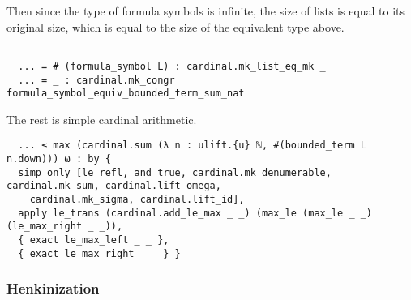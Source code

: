 \documentclass{article}
\newcommand{\<}{\langle}
\renewcommand{\>}{\rangle}
\theoremstyle{definitionstyle}
\theoremstyle{exercisestyle}
\theoremstyle{remarkstyle}
\begin{document}
Then since the type of formula symbols is infinite,
the size of lists is equal to its original size,
which is equal to the size of the equivalent type above.

\begin{lstlisting}

  ... = # (formula_symbol L) : cardinal.mk_list_eq_mk _
  ... = _ : cardinal.mk_congr formula_symbol_equiv_bounded_term_sum_nat \end{lstlisting}

The rest is simple cardinal arithmetic.

\begin{lstlisting}
  ... ≤ max (cardinal.sum (λ n : ulift.{u} ℕ, #(bounded_term L n.down))) ω : by {
  simp only [le_refl, and_true, cardinal.mk_denumerable, cardinal.mk_sum, cardinal.lift_omega,
    cardinal.mk_sigma, cardinal.lift_id],
  apply le_trans (cardinal.add_le_max _ _) (max_le (max_le _ _) (le_max_right _ _)),
  { exact le_max_left _ _ },
  { exact le_max_right _ _ } } \end{lstlisting}

\subsubsection{Henkinization}

{}

\end{document}

